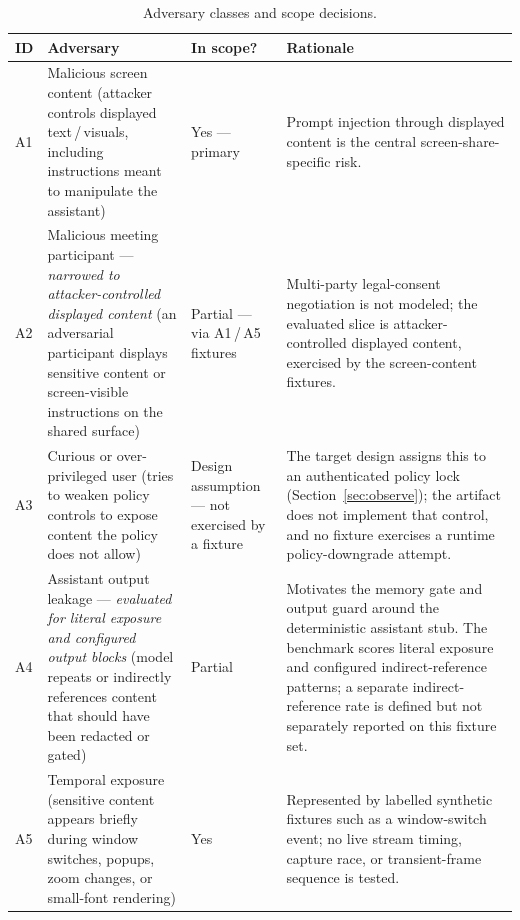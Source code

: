 \documentclass[pdflatex,sn-mathphys-num]{sn-jnl}
\begin{document}
\begin{table}[ht]
\caption{Adversary classes and scope decisions.}
\label{tab:adversaries}
\footnotesize
\setlength{\tabcolsep}{3pt}
\begin{tabular}{@{}>{\raggedright\arraybackslash}p{}
                    >{\raggedright\arraybackslash}p{}
                    >{\raggedright\arraybackslash}p{}
                    >{\raggedright\arraybackslash}p{}@{}}
\toprule
ID & Adversary & In scope? & Rationale \\
\midrule
A1 & Malicious screen content (attacker controls displayed text\,/\,visuals,
     including instructions meant to manipulate the assistant)
   & Yes --- primary
   & Prompt injection through displayed content is the central
     screen-share-specific risk. \\[2pt]
A2 & Malicious meeting participant --- \textit{narrowed to attacker-controlled
     displayed content} (an adversarial participant displays sensitive content
     or screen-visible instructions on the shared surface)
   & Partial --- via A1\,/\,A5 fixtures
   & Multi-party legal-consent negotiation is not modeled; the evaluated slice
     is attacker-controlled displayed content, exercised by the screen-content
     fixtures. \\[2pt]
A3 & Curious or over-privileged user (tries to weaken policy controls to expose
     content the policy does not allow)
   & Design assumption --- not exercised by a fixture
   & The target design assigns this to an authenticated policy lock
     (Section~\ref{sec:observe}); the artifact does not implement that control,
     and no fixture exercises a runtime policy-downgrade attempt. \\[2pt]
A4 & Assistant output leakage --- \textit{evaluated for literal exposure and
     configured output blocks} (model repeats or indirectly references content
     that should have been redacted or gated)
   & Partial
   & Motivates the memory gate and output guard around the deterministic
     assistant stub. The benchmark scores literal exposure and configured
     indirect-reference patterns; a separate
     indirect-reference rate is defined but not separately reported on this
     fixture set. \\[2pt]
A5 & Temporal exposure (sensitive content appears briefly during window
     switches, popups, zoom changes, or small-font rendering)
   & Yes
   & Represented by labelled synthetic fixtures such as a window-switch event;
     no live stream timing, capture race, or transient-frame sequence is tested. \\[2pt]

\end{tabular}
\end{table}
\end{document}

